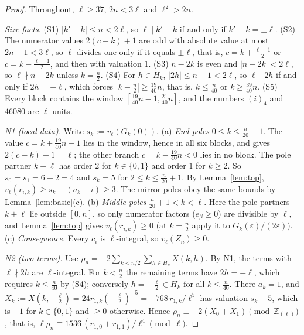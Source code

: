 \documentclass{amsart}
\theoremstyle{definition}
\theoremstyle{remark}
\numberwithin{equation}{section}
\newcommand{\Z}{\mathbb{Z}}
\begin{document}
\begin{proof}
Throughout, $\ell\ge37$, $2n<3\ell$ and $\ell^2>2n$.

\emph{Size facts.} (S1) $|k'-k|\le n<2\ell$, so $\ell\mid k'-k$ if and only
if $k'-k=\pm\ell$. (S2) The numerator values $2(c-k)+1$ are odd with absolute
value at most $2n-1<3\ell$, so $\ell$ divides one only if it equals $\pm\ell$,
that is, $c=k+\frac{\ell-1}2$ or $c=k-\frac{\ell+1}2$, and then with
valuation $1$. (S3) $n-2k$ is even and $|n-2k|<2\ell$, so $\ell\nmid n-2k$
unless $k=\frac n2$. (S4) For $h\in H_k$, $|2h|\le n-1<2\ell$, so $\ell\mid2h$
if and only if $2h=\pm\ell$, which forces $|k-\frac n2|\ge\frac{19}{40}n$,
that is, $k\le\frac n{40}$ or $k\ge\frac{39}{40}n$. (S5) Every block contains
the window $[\frac{19}{40}n-1,\frac{21}{40}n]$, and the numbers $(i)_4$ and
$46080$ are $\ell$-units.

\emph{N1 (local data).} Write $s_k:=v_\ell(G_k(0))$.
(a) \emph{End poles} $0\le k\le\frac n{20}+1$. The value
$c=k+\frac{19}{40}n-1$ lies in the window, hence in all six blocks, and gives
$2(c-k)+1=\ell$; the other branch $c=k-\frac{19}{40}n<0$ lies in no block. The
pole partner $k+\ell$ has order $2$ for $k\in\{0,1\}$ and order $1$ for
$k\ge2$. So $s_0=s_1=6-2=4$ and $s_k=5$ for $2\le k\le\frac n{20}+1$. By
Lemma~\ref{lem:top}, $v_\ell(r_{i,k})\ge s_k-(a_k-i)\ge3$. The mirror poles
obey the same bounds by Lemma~\ref{lem:basic}(c).
(b) \emph{Middle poles} $\frac n{20}+1<k<\ell$. Here the pole partners
$k\pm\ell$ lie outside $[0,n]$, so only numerator factors ($e_\beta\ge0$) are
divisible by $\ell$, and Lemma~\ref{lem:top} gives $v_\ell(r_{i,k})\ge0$ (at
$k=\frac n2$ apply it to $G_k(\varepsilon)/(2\varepsilon)$).
(c) \emph{Consequence.} Every $c_i$ is $\ell$-integral, so $v_\ell(Z_n)\ge0$.

\emph{N2 (two terms).} Use $\rho_n=-2\sum_{k<n/2}\sum_{h\in H_k}X(k,h)$. By N1,
the terms with $\ell\nmid2h$ are $\ell$-integral. For $k<\frac n2$ the
remaining terms have $2h=-\ell$, which requires $k\le\frac n{40}$ by (S4);
conversely $h=-\frac\ell2\in H_k$ for all $k\le\frac n{40}$. There $a_k=1$,
and $X_k:=X(k,-\frac\ell2)=24r_{1,k}(-\frac\ell2)^{-5}=-768\,r_{1,k}/\ell^5$
has valuation $s_k-5$, which is $-1$ for $k\in\{0,1\}$ and $\ge0$ otherwise.
Hence $\rho_n\equiv-2(X_0+X_1)\pmod{\Z_{(\ell)}}$, that is,
$\ell\rho_n\equiv1536\,(r_{1,0}+r_{1,1})/\ell^4\pmod\ell$.


\end{proof}
\end{document}
